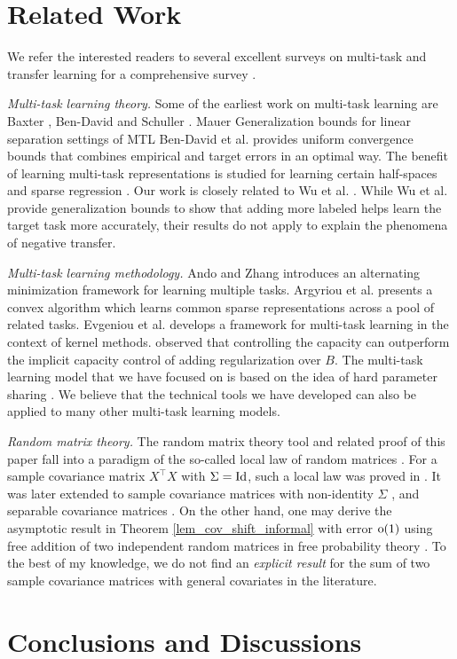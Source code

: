 \section{Related Work}


We refer the interested readers to several excellent surveys on multi-task and transfer learning for a comprehensive survey \cite{PY09,R17,ZY17,V20}.

\textit{Multi-task learning theory.}
Some of the earliest work on multi-task learning are Baxter \cite{B00}, Ben-David and Schuller \cite{BS03}.
Mauer \cite{M06} Generalization bounds for linear separation settings of MTL
Ben-David et al. \cite{BBCK10} provides uniform convergence bounds that combines empirical and target errors in an optimal way.
The benefit of learning multi-task representations is studied for learning certain half-spaces \cite{MPR16} and sparse regression \cite{LPTV09,LPVT11}.
Our work is closely related to Wu et al. \cite{WZR20}.
While Wu et al. provide generalization bounds to show that adding more labeled helps learn the target task more accurately, their results do not apply to explain the phenomena of negative transfer.

\textit{Multi-task learning methodology.}
Ando and Zhang \cite{AZ05} introduces an alternating minimization framework for learning multiple tasks.
Argyriou et al. \cite{AEP08} presents a convex algorithm which learns common sparse representations across a pool of related tasks.
Evgeniou et al. \cite{EMP05} develops a framework for multi-task learning in the context of kernel methods.
\cite{KD12} observed that controlling the capacity can outperform the implicit capacity control of adding regularization over $B$.
The multi-task learning model that we have focused on is based on the idea of hard parameter sharing \cite{C93,R17}.
We believe that the technical tools we have developed can also be applied to many other multi-task learning models.

\textit{Random matrix theory.} The random matrix theory tool and related proof of this paper fall into a paradigm of the so-called local law of random matrices \cite{erdos2017dynamical}. For a sample covariance matrix $X^\top X$ with $\Sigma=\operatorname{Id}$, such a local law was proved in \cite{isotropic}. It was later extended to sample covariance matrices with non-identity $\Sigma$ \cite{Anisotropic}, and separable covariance matrices \cite{yang2019spiked}. On the other hand, one may derive the asymptotic result in Theorem \ref{lem_cov_shift_informal} with error $\operatorname{o}(1)$ using free addition of two independent random matrices in free probability theory \cite{nica2006lectures}. To the best of my knowledge, we do not find an {\it explicit result} for the sum of two sample covariance matrices with general covariates in the literature.



\section{Conclusions and Discussions}
